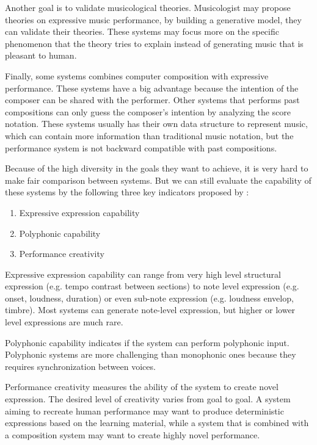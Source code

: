 Another goal is to validate musicological theories. Musicologist may propose theories on expressive music performance, by building a generative model, they can validate their theories. These systems may focus more on the specific phenomenon that the theory tries to explain instead of generating music that is pleasant to human. 


Finally, some systems combines computer composition with expressive performance. These systems have a big advantage because the intention of the composer can be shared with the performer. Other systems that performs past compositions can only guess the composer's intention by analyzing the score notation. These systems usually has their own data structure to represent music, which can contain more information than traditional music notation, but the performance system is not backward compatible with past compositions.


Because of the high diversity in the goals they want to achieve, it is very hard to make fair comparison between systems. But we can still evaluate the capability of these systems by the following three key indicators proposed by \cite{THEBOOK}:
\begin{enumerate}
   \item Expressive expression capability
   \item Polyphonic capability
   \item Performance creativity
\end{enumerate}

Expressive expression capability can range from very high level structural expression (e.g. tempo contrast between sections) to note level expression (e.g. onset, loudness, duration) or even sub-note expression (e.g. loudness envelop, timbre). Most systems can generate note-level expression, but higher or lower level expressions are much rare.

Polyphonic capability indicates if the system can perform polyphonic input. Polyphonic systems are more challenging than monophonic ones because they requires synchronization between voices. 

Performance creativity measures the ability of the system to create novel expression. The desired level of creativity varies from goal to goal. A system aiming to recreate human performance may want to produce deterministic expressions based on the learning material, while a system that is combined with a composition system may want to create highly novel performance. 


